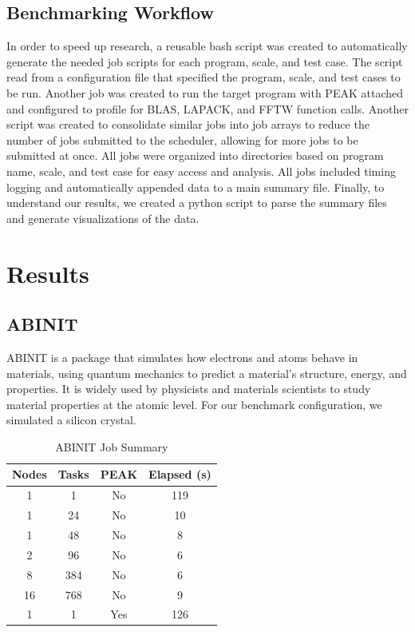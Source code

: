 \documentclass[conference]{IEEEtran}
\begin{document}
\subsection{Benchmarking Workflow}
In order to speed up research, a reusable bash script was created to automatically generate the needed job scripts for each program, scale, and test case. The script read from a configuration file that specified the program, scale, and test cases to be run. Another job was created to run the target program with PEAK attached and configured to profile for BLAS, LAPACK, and FFTW function calls. Another script was created to consolidate similar jobs into job arrays to reduce the number of jobs submitted to the scheduler, allowing for more jobs to be submitted at once. All jobs were organized into directories based on program name, scale, and test case for easy access and analysis. All jobs included timing logging and automatically appended data to a main summary file. Finally, to understand our results, we created a python script to parse the summary files and generate visualizations of the data.

\section{Results}

\subsection{ABINIT}
ABINIT is a package that simulates how electrons and atoms behave in materials, using quantum mechanics to predict a material's structure, energy, and properties. It is widely used by physicists and materials scientists to study material properties at the atomic level. For our benchmark configuration, we simulated a silicon crystal.

\begin{table}[H]
\centering
\caption{ABINIT Job Summary}
\label{tab:abinit-summary}
\scriptsize
\begin{tabular}{c c c c}
\toprule
Nodes & Tasks & PEAK & Elapsed (s) \\
\midrule
1  & 1   & No  & 119 \\
1  & 24  & No  & 10  \\
1  & 48  & No  & 8   \\
2  & 96  & No  & 6   \\
8  & 384 & No  & 6   \\
16 & 768 & No  & 9   \\
1  & 1   & Yes & 126 \\
\bottomrule
\end{tabular}
\end{table}
\end{document}
